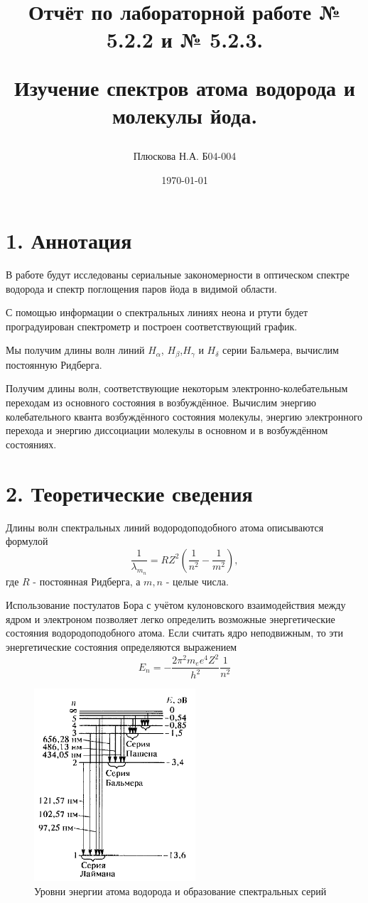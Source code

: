 \documentclass[a4paper,12pt]{report}
\title{Отчёт по лабораторной работе № 5.2.2 и № 5.2.3. 

Изучение спектров атома водорода и молекулы йода.}
\author{Плюскова Н.А. Б04-004 }
\date{\today}
\begin{document}
\maketitle
\section*{1. Аннотация}
В работе будут исследованы сериальные закономерности в оптическом спектре водорода и спектр поглощения паров йода в видимой области.
	
С помощью информации о спектральных линиях неона и ртути будет проградуирован спектрометр и построен соответствующий график.
	
Мы получим длины волн линий $H_{\alpha}$, $H_{\beta}$,$H_{\gamma}$ и  $H_{\delta}$ серии Бальмера, вычислим постоянную Ридберга.

Получим длины волн, соответствующие некоторым электронно-колебательным переходам из основного состояния в возбуждённое. Вычислим энергию колебательного кванта возбуждённого состояния молекулы, энергию электронного перехода и энергию диссоциации молекулы в основном и в возбуждённом состояниях.

\section*{2. Теоретические сведения}
Длины волн спектральных линий водородоподобного атома описываются формулой
\begin{equation}
    \frac{1}{\lambda_m_n} = RZ^2(\frac{1}{n^2} - \frac{1}{m^2}),
\end{equation}
где $R$ - постоянная Ридберга, а $m, n$ -  целые числа. \par
Использование постулатов Бора с учётом кулоновского взаимодействия между ядром и электроном позволяет легко определить возможные энергетические состояния водородоподобного атома. Если считать ядро неподвижным, то эти энергетические состояния определяются выражением
\begin{equation}
    E_n = -\frac{2 \pi^2 m_e e^4 Z^2}{h^2} \frac{1}{n^2}
\end{equation}

\begin{figure}[h]
    \centering
    \includegraphics[width=6cm]{fig3.PNG}
    \caption{Уровни энергии атома водорода и образование спектральных серий}
    \label{fig:vac}
\end{figure}
\end{document}

